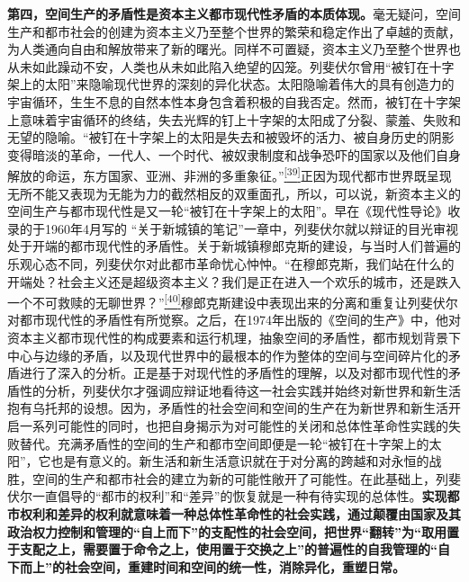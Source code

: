 \documentclass[UTF8, fontset = sourcesans, a4paper, oneside, zihao =
-4, scheme=chinese, no-math, space=true]{ctexbook}
\begin{document}
\textbf{第四，空间生产的矛盾性是资本主义都市现代性矛盾的本质体现。}毫无疑问，空间生产和都市社会的创建为资本主义乃至整个世界的繁荣和稳定作出了卓越的贡献，为人类通向自由和解放带来了新的曙光。同样不可置疑，资本主义乃至整个世界也从未如此躁动不安，人类也从未如此陷入绝望的囚笼。列斐伏尔曾用``被钉在十字架上的太阳''来隐喻现代世界的深刻的异化状态。太阳隐喻着伟大的具有创造力的宇宙循环，生生不息的自然本性本身包含着积极的自我否定。然而，被钉在十字架上意味着宇宙循环的终结，失去光辉的钉上十字架的太阳成了分裂、蒙羞、失败和无望的隐喻。``被钉在十字架上的太阳是失去和被毁坏的活力、被自身历史的阴影变得暗淡的革命，一代人、一个时代、被奴隶制度和战争恐吓的国家以及他们自身解放的命运，东方国家、亚洲、非洲的多重象征。''\protect\hypertarget{part0005_split_002.htmlux5cux23w39}{}{}\protect\hyperlink{part0005_split_003.htmlux5cux23m39}{\textsuperscript{{[}39{]}}}正因为现代都市世界既呈现无所不能又表现为无能为力的截然相反的双重面孔，所以，可以说，新资本主义的空间生产与都市现代性是又一轮``被钉在十字架上的太阳''。早在《现代性导论》收录的于1960年4月写的
``关于新城镇的笔记''一章中，列斐伏尔就以辩证的目光审视处于开端的都市现代性的矛盾性。关于新城镇穆郎克斯的建设，与当时人们普遍的乐观心态不同，列斐伏尔对此都市革命忧心忡忡。``在穆郎克斯，我们站在什么的开端处？社会主义还是超级资本主义？我们是正在进入一个欢乐的城市，还是跌入一个不可救赎的无聊世界？''\protect\hypertarget{part0005_split_002.htmlux5cux23w40}{}{}\protect\hyperlink{part0005_split_003.htmlux5cux23m40}{\textsuperscript{{[}40{]}}}穆郎克斯建设中表现出来的分离和重复让列斐伏尔对都市现代性的矛盾性有所觉察。之后，在1974年出版的《空间的生产》中，他对资本主义都市现代性的构成要素和运行机理，抽象空间的矛盾性，都市规划背景下中心与边缘的矛盾，以及现代世界中的最根本的作为整体的空间与空间碎片化的矛盾进行了深入的分析。正是基于对现代性的矛盾性的理解，以及对都市现代性的矛盾性的分析，列斐伏尔才强调应辩证地看待这一社会实践并始终对新世界和新生活抱有乌托邦的设想。因为，矛盾性的社会空间和空间的生产在为新世界和新生活开启一系列可能性的同时，也把自身揭示为对可能性的关闭和总体性革命性实践的失败替代。充满矛盾性的空间的生产和都市空间即便是一轮``被钉在十字架上的太阳''，它也是有意义的。新生活和新生活意识就在于对分离的跨越和对永恒的战胜，空间的生产和都市社会的建立为新的可能性敞开了可能性。在此基础上，列斐伏尔一直倡导的``都市的权利''和``差异''的恢复就是一种有待实现的总体性。\textbf{实现都市权利和差异的权利就意味着一种总体性革命性的社会实践，通过颠覆由国家及其政治权力控制和管理的``自上而下''的支配性的社会空间，把世界``翻转''为``取用置于支配之上，需要置于命令之上，使用置于交换之上''的普遍性的自我管理的``自下而上''的社会空间，重建时间和空间的统一性，消除异化，重塑日常。}
\end{document}
